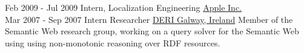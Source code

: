 \documentclass[letterpaper]{twentysecondcv} %
\begin{document}
\begin{twenty}
     \twentyitem
      {Feb 2009 -}
    {Jul 2009}
        {Intern, Localization Engineering}
        {\href{http://www.apple.com/}{Apple Inc.}}
        {}
        {
      }
     \\
     \twentyitem
        {Mar 2007 -}
        {Sep 2007}
        {Intern Researcher}
        {\href{http://www.deri.ie/}{DERI Galway, Ireland}}
        {Member of the Semantic Web research group, working on a query solver for the Semantic Web using using non-monotonic reasoning over RDF resources.}

\end{twenty}
\end{document}
